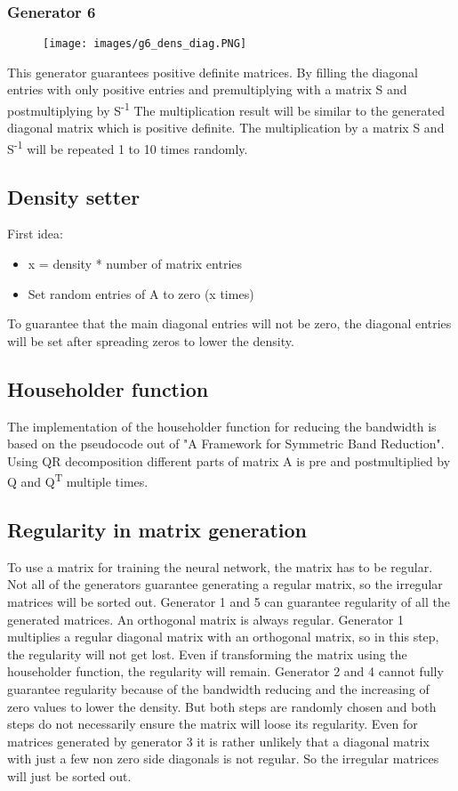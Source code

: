\documentclass[parskip=full]{scrartcl}
\begin{document}
\subsubsection{Generator 6}
\begin{figure}[h!]
	\texttt{[image: images/g6\_dens\_diag.PNG]}
\end{figure}
\newpage
This generator guarantees positive definite matrices.
By filling the diagonal entries with only positive entries and premultiplying with a matrix S and postmultiplying by S\textsuperscript{-1}
The multiplication result will be similar to the generated diagonal matrix which is positive definite. The multiplication by a matrix S and S\textsuperscript{-1} will be repeated 1 to 10 times randomly.

\subsection{Density setter}
First idea:
\begin{itemize}
	\item x = density * number of matrix entries
	\item Set random entries of A to zero (x times)
\end{itemize}
To guarantee that the main diagonal entries will not be zero, the diagonal entries will be set after spreading zeros to lower the density.


\subsection{Householder function}
The implementation of the householder function for reducing the bandwidth is based on the pseudocode out of "A Framework for Symmetric Band Reduction". 
Using QR decomposition different parts of matrix A is pre and postmultiplied by Q and Q\textsuperscript{T} multiple times.

\subsection{Regularity in matrix generation}
To use a matrix for training the neural network, the matrix has to be regular.
Not all of the generators guarantee generating a regular matrix, so the irregular matrices will be sorted out.
Generator 1 and 5 can guarantee regularity of all the generated matrices. An orthogonal matrix is always regular. 
Generator 1 multiplies a regular diagonal matrix with an orthogonal matrix, so in this step, the regularity will not get lost.
Even if transforming the matrix using the householder function, the regularity will remain.
Generator 2 and 4 cannot fully guarantee regularity because of the bandwidth reducing and the increasing of zero values to lower the density.
But both steps are randomly chosen and both steps do not necessarily ensure the matrix will loose its regularity.
Even for matrices generated by generator 3 it is rather unlikely that a diagonal matrix with just a few non zero side diagonals is not regular.
So the irregular matrices will just be sorted out.
\end{document}
